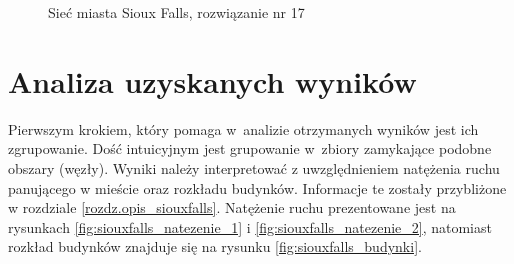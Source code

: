 \documentclass[twoside,12pt]{report}
\begin{document}
\begin{figure}[htbp]
\centering
{}
\caption{Sieć miasta Sioux Falls, rozwiązanie nr 17}
\label{fig:sioux17}
\end{figure}

\clearpage
\section{Analiza uzyskanych wyników}\label{rozdz.analiza_uzyskanych_wynikow}
Pierwszym krokiem, który pomaga w~analizie otrzymanych wyników jest ich zgrupowanie. Dość intuicyjnym jest grupowanie w~zbiory zamykające podobne obszary (węzły). Wyniki należy interpretować z uwzględnieniem natężenia ruchu panującego w mieście oraz rozkładu budynków. Informacje te zostały przybliżone w rozdziale \ref{rozdz.opis_siouxfalls}. Natężenie ruchu prezentowane jest na rysunkach \ref{fig:siouxfalls_natezenie_1} i \ref{fig:siouxfalls_natezenie_2}, natomiast rozkład budynków znajduje się na rysunku \ref{fig:siouxfalls_budynki}.
\end{document}
